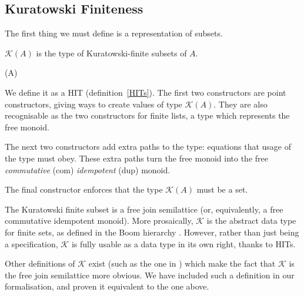 \subsection{Kuratowski Finiteness}
The first thing we must define is a representation of subsets.
\begin{definition}
  \(\mathcal{K}(A)\) is the type of Kuratowski-finite subsets of \(A\).
  \begin{inductivetype}{(A)}
  \end{inductivetype}
  We define it as a HIT (definition~\ref{HITs}).
  The first two constructors are point constructors, giving ways to create
  values of type \(\mathcal{K}(A)\).
  They are also recognisable as the two constructors for finite lists, a type
  which represents the free monoid.

  The next two constructors add extra paths to the type: equations that usage of
  the type must obey.
  These extra paths turn the free monoid into the free \emph{commutative} (com)
  \emph{idempotent} (dup) monoid.

  The final constructor enforces that the type \(\mathcal{K}(A)\) must be a set.
\end{definition}
The Kuratowski finite subset is a free join semilattice (or, equivalently, a
free commutative idempotent monoid).
More prosaically, \(\mathcal{K}\) is the abstract data type for finite sets, as
defined in the Boom hierarchy \cite{boomFurtherThoughtsAbstracto1981,
  bunkenburgBoomHierarchy1994}.
However, rather than just being a specification, \(\mathcal{K}\) is fully usable
as a data type in its own right, thanks to HITs.

Other definitions of \(\mathcal{K}\) exist (such as the one in
\cite{fruminFiniteSetsHomotopy2018}) which make the fact that \(\mathcal{K}\) is
the free join semilattice more obvious.
We have included such a definition in our formalisation, and proven it
equivalent to the one above.

